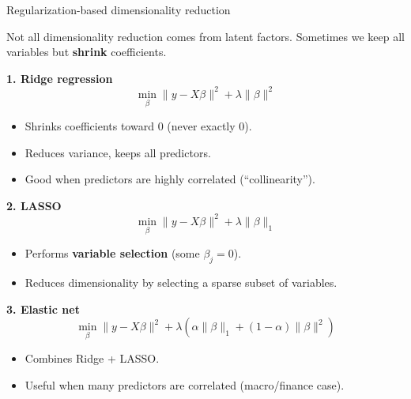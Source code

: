 \documentclass{beamer}
\begin{document}
\begin{frame}{Regularization-based dimensionality reduction}
\footnotesize

Not all dimensionality reduction comes from latent factors. Sometimes we keep all variables but \textbf{shrink} coefficients.

\medskip

\textbf{1. Ridge regression}
\[
\min_\beta \|y - X\beta\|^2 + \lambda \|\beta\|^2
\]
\begin{itemize}
    \item Shrinks coefficients toward 0 (never exactly 0).
    \item Reduces variance, keeps all predictors.
    \item Good when predictors are highly correlated (“collinearity”).
\end{itemize}

\textbf{2. LASSO}
\[
\min_\beta \|y - X\beta\|^2 + \lambda \|\beta\|_1
\]
\begin{itemize}
    \item Performs \textbf{variable selection} (some $\beta_j = 0$).
    \item Reduces dimensionality by selecting a sparse subset of variables.
\end{itemize}

\textbf{3. Elastic net}
\[
\min_\beta \|y - X\beta\|^2 + 
\lambda\left( \alpha \|\beta\|_1 + (1-\alpha)\|\beta\|^2\right)
\]
\begin{itemize}
    \item Combines Ridge + LASSO.
    \item Useful when many predictors are correlated (macro/finance case).
\end{itemize}

\end{frame}
\end{document}
